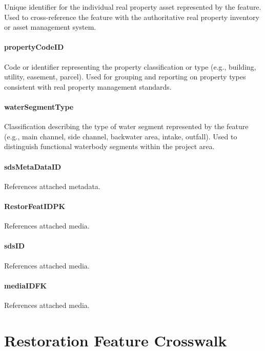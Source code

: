 \documentclass[
  letterpaper,
  DIV=11,
  numbers=noendperiod]{scrreprt}
\begin{document}
Unique identifier for the individual real property asset represented by
the feature. Used to cross-reference the feature with the authoritative
real property inventory or asset management system.

\subsection{propertyCodeID}\label{propertycodeid-5}

Code or identifier representing the property classification or type
(e.g., building, utility, easement, parcel). Used for grouping and
reporting on property types consistent with real property management
standards.

\subsection{waterSegmentType}\label{watersegmenttype}

Classification describing the type of water segment represented by the
feature (e.g., main channel, side channel, backwater area, intake,
outfall). Used to distinguish functional waterbody segments within the
project area.

\subsection{sdsMetaDataID}\label{sdsmetadataid-26}

References attached metadata.

\subsection{RestorFeatIDPK}\label{restorfeatidpk-26}

References attached media.

\subsection{sdsID}\label{sdsid-26}

References attached media.

\subsection{mediaIDFK}\label{mediaidfk-24}

References attached media.

\part{Restoration Feature Crosswalk}
\end{document}
